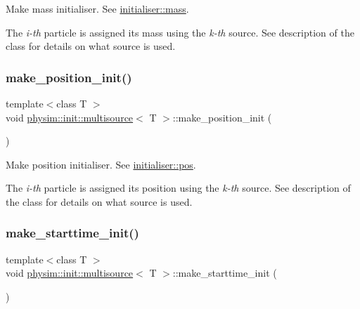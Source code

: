 Make mass initialiser. See \hyperlink{classphysim_1_1init_1_1initialiser_aaf4931c0b596b54097c43d9439d03edc}{initialiser\+::mass}. 

The {\itshape i-\/th} particle is assigned its mass using the {\itshape k-\/th} source. See description of the class for details on what source is used. \mbox{\label{classphysim_1_1init_1_1multisource_a41bf00a8e0b8b60d7ca86dc9dd00c0db}} 
\subsubsection{\texorpdfstring{make\+\_\+position\+\_\+init()}{make\_position\_init()}}
{\footnotesize\ttfamily template$<$class T $>$ \\
void \hyperlink{classphysim_1_1init_1_1multisource}{physim\+::init\+::multisource}$<$ T $>$\+::make\+\_\+position\+\_\+init (\begin{DoxyParamCaption}{ }\end{DoxyParamCaption})}



Make position initialiser. See \hyperlink{classphysim_1_1init_1_1initialiser_a1980105ffaa655858b90a8f3a9368682}{initialiser\+::pos}. 

The {\itshape i-\/th} particle is assigned its position using the {\itshape k-\/th} source. See description of the class for details on what source is used. \mbox{\label{classphysim_1_1init_1_1multisource_adf2deaa3069a402b578d461b620d71e9}} 
\subsubsection{\texorpdfstring{make\+\_\+starttime\+\_\+init()}{make\_starttime\_init()}}
{\footnotesize\ttfamily template$<$class T $>$ \\
void \hyperlink{classphysim_1_1init_1_1multisource}{physim\+::init\+::multisource}$<$ T $>$\+::make\+\_\+starttime\+\_\+init (\begin{DoxyParamCaption}{ }\end{DoxyParamCaption})}



